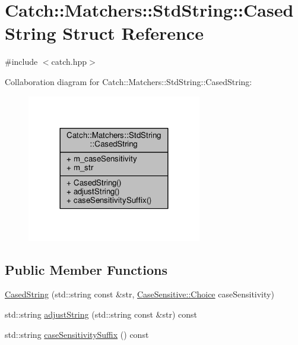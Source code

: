 \hypertarget{struct_catch_1_1_matchers_1_1_std_string_1_1_cased_string}{\section{Catch\-:\-:Matchers\-:\-:Std\-String\-:\-:Cased\-String Struct Reference}
\label{struct_catch_1_1_matchers_1_1_std_string_1_1_cased_string}
}


{\ttfamily \#include $<$catch.\-hpp$>$}



Collaboration diagram for Catch\-:\-:Matchers\-:\-:Std\-String\-:\-:Cased\-String\-:
\nopagebreak
\begin{figure}[H]
\begin{center}
\leavevmode
\includegraphics[width=216pt]{struct_catch_1_1_matchers_1_1_std_string_1_1_cased_string__coll__graph}
\end{center}
\end{figure}
\subsection*{Public Member Functions}
\begin{DoxyCompactItemize}
\item 
\hyperlink{struct_catch_1_1_matchers_1_1_std_string_1_1_cased_string_aa88bbc5acd2bff22351d8d4b1816b561}{Cased\-String} (std\-::string const \&str, \hyperlink{struct_catch_1_1_case_sensitive_aad49d3aee2d97066642fffa919685c6a}{Case\-Sensitive\-::\-Choice} case\-Sensitivity)
\item 
std\-::string \hyperlink{struct_catch_1_1_matchers_1_1_std_string_1_1_cased_string_a0ff84e194426c8f4bca0660b9180d20d}{adjust\-String} (std\-::string const \&str) const 
\item 
std\-::string \hyperlink{struct_catch_1_1_matchers_1_1_std_string_1_1_cased_string_a1113c80dd02967032a99290bdcd1b590}{case\-Sensitivity\-Suffix} () const 
\end{DoxyCompactItemize}
